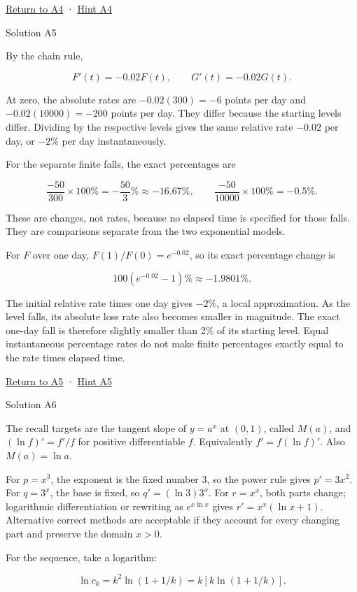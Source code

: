 \documentclass[
  11pt,
]{article}
\begin{document}
\protect\hyperlink{task-a4}{Return to A4} ·
\protect\hyperlink{hint-a4}{Hint A4}

Solution A5

By the chain rule,

\[
F'(t)=-0.02F(t),\qquad G'(t)=-0.02G(t).
\]

At zero, the absolute rates are \(-0.02(300)=-6\) points per day and
\(-0.02(10000)=-200\) points per day. They differ because the starting
levels differ. Dividing by the respective levels gives the same relative
rate \(-0.02\) per day, or \(-2\%\) per day instantaneously.

For the separate finite falls, the exact percentages are

\[
\frac{-50}{300}\times100\%=-\frac{50}{3}\%\approx-16.67\%,\qquad
\frac{-50}{10000}\times100\%=-0.5\%.
\]

These are changes, not rates, because no elapsed time is specified for
those falls. They are comparisons separate from the two exponential
models.

For \(F\) over one day, \(F(1)/F(0)=e^{-0.02}\), so its exact percentage
change is

\[
100(e^{-0.02}-1)\%\approx-1.9801\%.
\]

The initial relative rate times one day gives \(-2\%\), a local
approximation. As the level falls, its absolute loss rate also becomes
smaller in magnitude. The exact one-day fall is therefore slightly
smaller than 2\% of its starting level. Equal instantaneous percentage
rates do not make finite percentages exactly equal to the rate times
elapsed time.

\protect\hyperlink{task-a5}{Return to A5} ·
\protect\hyperlink{hint-a5}{Hint A5}

Solution A6

The recall targets are the tangent slope of \(y=a^x\) at \((0,1)\),
called \(M(a)\), and \((\ln f)'=f'/f\) for positive differentiable
\(f\). Equivalently \(f'=f(\ln f)'\). Also \(M(a)=\ln a\).

For \(p=x^3\), the exponent is the fixed number 3, so the power rule
gives \(p'=3x^2\). For \(q=3^x\), the base is fixed, so
\(q'=(\ln3)3^x\). For \(r=x^x\), both parts change; logarithmic
differentiation or rewriting as \(e^{x\ln x}\) gives
\(r'=x^x(\ln x+1)\). Alternative correct methods are acceptable if they
account for every changing part and preserve the domain \(x>0\).

For the sequence, take a logarithm:

\[
\ln c_k=k^2\ln(1+1/k)
=k\left[k\ln(1+1/k)\right].
\]
\end{document}
